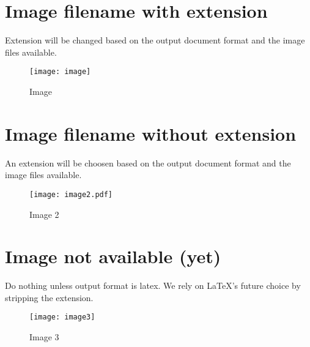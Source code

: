 \hypertarget{image-filename-with-extension}{%
\section{Image filename with
extension}\label{image-filename-with-extension}}

Extension will be changed based on the output document format and the
image files available.

\begin{figure}
\centering
\texttt{[image: image]}
\caption{Image}
\end{figure}

\hypertarget{image-filename-without-extension}{%
\section{Image filename without
extension}\label{image-filename-without-extension}}

An extension will be choosen based on the output document format and the
image files available.

\begin{figure}
\centering
\texttt{[image: image2.pdf]}
\caption{Image 2}
\end{figure}

\hypertarget{image-not-available-yet}{%
\section{Image not available (yet)}\label{image-not-available-yet}}

Do nothing unless output format is latex. We rely on LaTeX's future
choice by stripping the extension.

\begin{figure}
\centering
\texttt{[image: image3]}
\caption{Image 3}
\end{figure}
